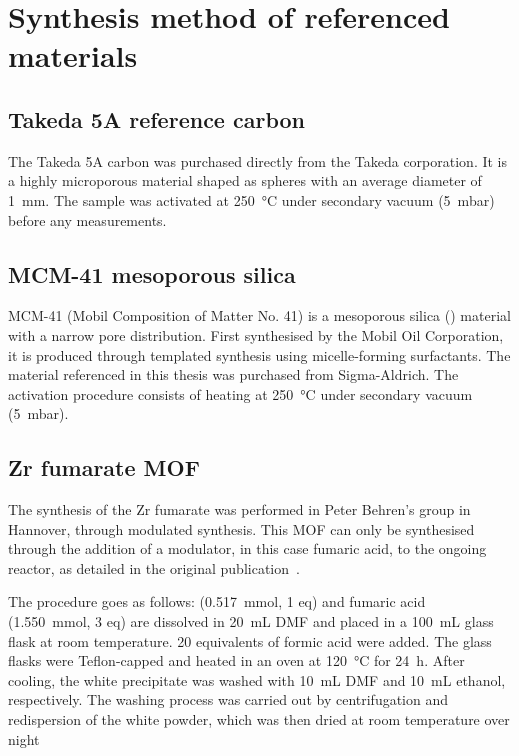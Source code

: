 
\graphicspath{ {\thisappx/figures/} }

\chapter{Synthesis method of referenced materials}%
\label{appx:synthesis}

\section{Takeda 5A reference carbon}%
\label{appx:synthesis:takeda}

The Takeda 5A carbon was purchased directly from the Takeda corporation.
It is a highly microporous material shaped as spheres with an average
diameter of \SI{1}{\milli\metre}.
The sample was activated at \SI{250}{\celsius} under 
secondary vacuum (\SI{5}{\milli\bar}) before any measurements.

\section{MCM-41 mesoporous silica}%
\label{appx:synthesis:mcm41}

MCM-41 (Mobil Composition of Matter No. 41) is a mesoporous silica 
() material with a narrow pore distribution. First synthesised 
by the Mobil Oil Corporation, it is produced through templated 
synthesis using micelle-forming surfactants.
The material referenced in this thesis was purchased from Sigma-Aldrich.
The activation procedure consists of heating at \SI{250}{\celsius} under 
secondary vacuum (\SI{5}{\milli\bar}).

\section{Zr fumarate MOF}%
\label{appx:synthesis:zrformate}

The synthesis of the Zr fumarate was performed in Peter Behren's 
group in Hannover, through modulated synthesis. This \gls{MOF} can only
be synthesised through the addition of a modulator, in this case
fumaric acid, to the ongoing reactor, as detailed in the 
original publication~\cite{wissmannModulatedSynthesisZrfumarate2012}.

The procedure goes as follows: 
(\SI{0.517}{\milli\mol}, 1 eq) and fumaric acid 
(\SI{1.550}{\milli\mol}, 3 eq) are dissolved 
in \SI{20}{\milli\liter} \gls{DMF}
and placed in a \SI{100}{\milli\liter} glass flask at room 
temperature. 20 equivalents of formic acid were added.
The glass flasks were Teflon-capped and heated in an oven at
\SI{120}{\degreeCelsius} for \SI{24}{\hour}. After cooling, 
the white precipitate was washed with \SI{10}{\milli\liter} 
\gls{DMF} and \SI{10}{\milli\liter} ethanol, respectively. 
The washing process was carried out by centrifugation and 
redispersion of the white powder, which was then
dried at room temperature over night


